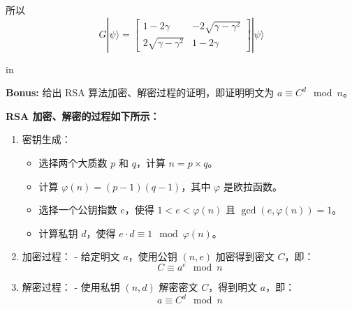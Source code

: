 \documentclass[11pt]{article}
\begin{document}
所以
\[
G|\psi\rangle = \begin{bmatrix}
    1-2\gamma & -2\sqrt{\gamma-\gamma^2} \\
    2\sqrt{\gamma-\gamma^2} & 1-2\gamma
\end{bmatrix} |\psi\rangle
\]

 in

\newpage
{\bf Bonus:} 给出 RSA 算法加密、解密过程的证明，即证明明文为 $a \equiv C^d \mod n$。

\textbf{RSA 加密、解密的过程如下所示：}
\begin{enumerate}
    \item 密钥生成：
    \begin{itemize}
        \item 选择两个大质数 \( p \) 和 \( q \)，计算 \( n = p \times q \)。
        \item 计算 \( \varphi(n) = (p-1)(q-1) \)，其中 \( \varphi \) 是欧拉函数。
        \item 选择一个公钥指数 \( e \)，使得 \( 1 < e < \varphi(n) \) 且 \( \gcd(e, \varphi(n)) = 1 \)。
        \item 计算私钥 \( d \)，使得 \( e \cdot d \equiv 1 \mod \varphi(n) \)。
    \end{itemize}
    \item 加密过程：
   - 给定明文 \( a \)，使用公钥 \( (n, e) \) 加密得到密文 \( C \)，即：
     \[
     C \equiv a^e \mod n
     \]

    \item 解密过程：
   - 使用私钥 \( (n, d) \) 解密密文 \( C \)，得到明文 \( a \)，即：
     \[
     a \equiv C^d \mod n
     \]
\end{enumerate}
\end{document}
